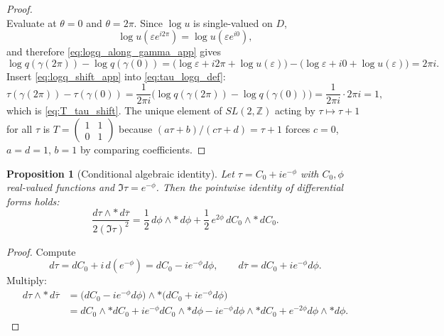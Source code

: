 \documentclass[11pt]{article}
\newtheorem{proposition}[theorem]{Proposition}
\theoremstyle{remark}
\begin{document}
{\begin{proof}
\begin{equation}
\end{equation}
Evaluate at $\theta=0$ and $\theta=2\pi$. Since $\log u$ is single-valued on $D$,
\begin{equation}\label{eq:logu_single_valued}
\log u(\varepsilon e^{i2\pi})=\log u(\varepsilon e^{i0}),
\end{equation}
and therefore \eqref{eq:logq_along_gamma_app} gives
\begin{equation}\label{eq:logq_shift_app}
\log q(\gamma(2\pi))-\log q(\gamma(0))=\bigl(\log\varepsilon+i2\pi+\log u(\varepsilon)\bigr)-\bigl(\log\varepsilon+i0+\log u(\varepsilon)\bigr)=2\pi i.
\end{equation}
Insert \eqref{eq:logq_shift_app} into \eqref{eq:tau_logq_def}:
\begin{equation}\label{eq:tau_shift_calc_app}
\tau(\gamma(2\pi))-\tau(\gamma(0))=\frac{1}{2\pi i}\bigl(\log q(\gamma(2\pi))-\log q(\gamma(0))\bigr)=\frac{1}{2\pi i}\cdot 2\pi i=1,
\end{equation}
which is \eqref{eq:T_tau_shift}. The unique element of $SL(2,\mathbb{Z})$ acting by $\tau\mapsto\tau+1$ for all $\tau$ is $T=\begin{pmatrix}1&1\\ 0&1\end{pmatrix}$ because $(a\tau+b)/(c\tau+d)=\tau+1$ forces $c=0$, $a=d=1$, $b=1$ by comparing coefficients.
\end{proof} 
\begin{proposition}[Conditional algebraic identity]\label{prop:tau_kinetic_identity}
Let $\tau=C_0+i e^{-\phi}$ with $C_0,\phi$ real-valued functions and $\Im\tau=e^{-\phi}$. Then the pointwise identity of differential forms holds:
\begin{equation}\label{eq:tau_kinetic_identity_app}
\frac{d\tau\wedge *\,d\overline{\tau}}{2(\Im\tau)^2}=\frac{1}{2}\,d\phi\wedge *\,d\phi+\frac{1}{2}\,e^{2\phi}\,dC_0\wedge *\,dC_0.
\end{equation}
\end{proposition}
\begin{proof}
Compute
\begin{equation}\label{eq:dtau_calc_app}
d\tau=dC_0+i\,d(e^{-\phi})=dC_0-i e^{-\phi}d\phi,\qquad d\overline{\tau}=dC_0+i e^{-\phi}d\phi.
\end{equation}
Multiply:
\begin{align}\label{eq:dtau_wedge_calc_app}
d\tau\wedge *\,d\overline{\tau}
&=\bigl(dC_0-i e^{-\phi}d\phi\bigr)\wedge *\bigl(dC_0+i e^{-\phi}d\phi\bigr)\\
&=dC_0\wedge *dC_0+i e^{-\phi}dC_0\wedge *d\phi-i e^{-\phi}d\phi\wedge *dC_0+e^{-2\phi}d\phi\wedge *d\phi.\nonumber

\end{align}
\end{proof}}
\end{document}
